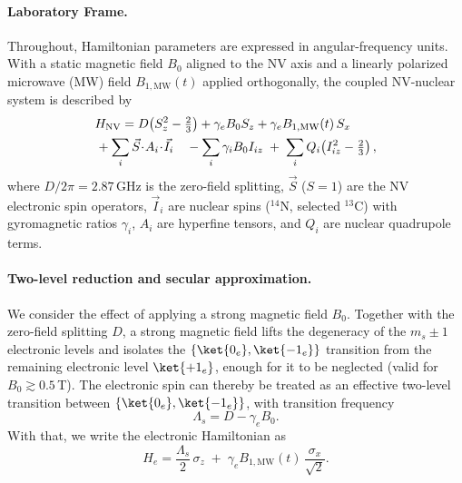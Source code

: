 \paragraph{Laboratory Frame.}
Throughout, Hamiltonian parameters are expressed in angular-frequency units. With a static magnetic field $B_0$ aligned to the NV axis and a linearly polarized microwave (MW) field $B_{1,\mathrm{MW}}(t)$ applied orthogonally, the coupled NV-nuclear system is described by
\begin{equation}
\begin{aligned}
H_{\mathrm{NV}}
&= D\!\left(S_z^2-\tfrac{2}{3}\right)
+ \gamma_e B_0 S_z
+ \gamma_e B_{1,\mathrm{MW}}(t)\,S_x\\
&\hspace{-0.7cm}+ \sum_i \vec{S}\!\cdot\! A_i \!\cdot\! \vec{I}_i 
\quad - \sum_i \gamma_i B_0 I_{iz}
\;+\; \sum_i Q_i\!\left(I_{iz}^2-\tfrac{2}{3}\right),
\end{aligned}
\label{eq:H_full}
\end{equation}
where $D/2\pi=2.87\,\mathrm{GHz}$ is the zero-field splitting, $\vec S$ ($S=1$) are the NV electronic spin operators, $\vec I_i$ are nuclear spins ($^{14}$N, selected $^{13}$C) with gyromagnetic ratios $\gamma_i$, $A_i$ are hyperfine tensors, and $Q_i$ are nuclear quadrupole terms.\\

\paragraph{Two-level reduction and secular approximation.}
We consider the effect of applying a strong magnetic field $B_0$. Together with the zero-field splitting $D$, a strong magnetic field lifts the degeneracy of the $m_s\pm1$ electronic levels and isolates the $\{\ket{0_e},\ket{-1_e}\}$ transition from the remaining electronic level $\ket{+1_e}$, enough for it to be neglected (valid for $B_0\gtrsim 0.5\,$T). The electronic spin can thereby be treated as an effective two-level transition between $\{\ket{0_e},\ket{-1_e}\}$, with transition frequency
\[
\Lambda_s = D - \gamma_e B_0.
\]
With that, we write the electronic Hamiltonian as
\begin{equation}
H_e = \frac{\Lambda_s}{2}\,\sigma_z \;+\; \gamma_e B_{1,\mathrm{MW}}(t)\,\frac{\sigma_x}{\sqrt{2}}.
\label{eq:He_def}
\end{equation}

